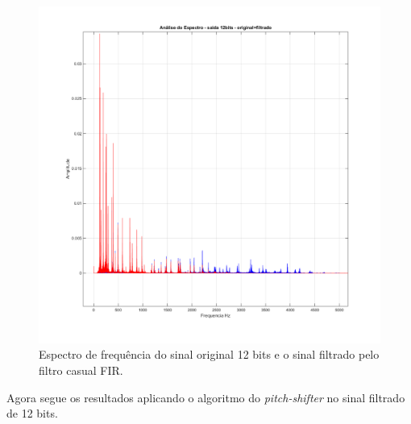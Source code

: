 		\begin{figure}[!ht]
			\centering
			\includegraphics[scale=0.5]{./figuras/simulacoes/audio12bits-original-filtrado.png}
			\caption{Espectro de frequência do sinal original 12 bits e o sinal filtrado pelo filtro casual FIR.}
			\label{fig-sinal12bits-filtrado}
		\end{figure}
	
		Agora segue os resultados aplicando o algoritmo do \textit{pitch-shifter} no sinal filtrado de 12 bits.
		
